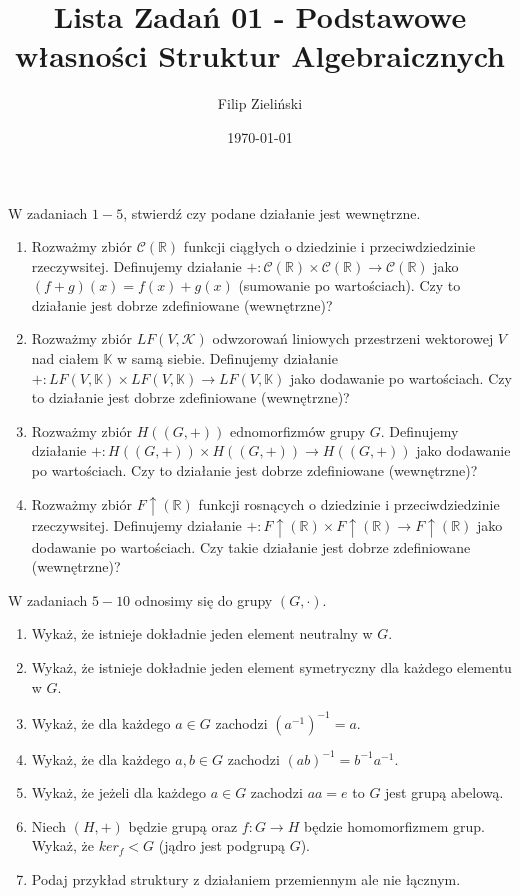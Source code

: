 \documentclass{article}
\title{Lista Zadań 01 - Podstawowe własności Struktur Algebraicznych}
\author{Filip Zieliński}
\date{\today}
\begin{document}
\maketitle

W zadaniach $1-5$, stwierdź czy podane działanie jest wewnętrzne.
\begin{enumerate}
    \item Rozważmy zbiór $\mathcal{C}(\mathbb{R})$ funkcji ciągłych o dziedzinie i przeciwdziedzinie rzeczywsitej. Definujemy działanie $+ : \mathcal{C}(\mathbb{R}) \times \mathcal{C}(\mathbb{R}) \rightarrow \mathcal{C}(\mathbb{R})$ jako $ (f + g)(x) = f(x) + g(x)$ (sumowanie po wartościach). Czy to działanie jest dobrze zdefiniowane (wewnętrzne)?
    \item Rozważmy zbiór $LF(V,\mathcal{K})$ odwzorowań liniowych przestrzeni wektorowej $V$ nad ciałem $\mathbb{K}$ w samą siebie. Definujemy działanie $+ : LF(V,\mathbb{K}) \times LF(V, \mathbb{K}) \rightarrow LF(V,\mathbb{K})$ jako dodawanie po wartościach. Czy to działanie jest dobrze zdefiniowane (wewnętrzne)?
    \item Rozważmy zbiór $H((G, +))$ ednomorfizmów grupy $G$. Definujemy działanie $+ : H((G, +)) \times H((G, +)) \rightarrow H((G, +))$ jako dodawanie po wartościach. Czy to działanie jest dobrze zdefiniowane (wewnętrzne)? 
    \item Rozważmy zbiór $F\uparrow(\mathbb{R})$ funkcji rosnących o dziedzinie i przeciwdziedzinie rzeczywsitej. Definujemy działanie $ + : F\uparrow(\mathbb{R}) \times F\uparrow(\mathbb{R}) \rightarrow F\uparrow(\mathbb{R})$ jako dodawanie po wartościach. Czy takie działanie jest dobrze zdefiniowane (wewnętrzne)?
\end{enumerate}
W zadaniach $5-10$ odnosimy się do grupy $(G,\cdot)$.
\begin{enumerate}[resume]
    \item Wykaż, że istnieje dokładnie jeden element neutralny w $G$. 
    \item Wykaż, że istnieje dokładnie jeden element symetryczny dla każdego elementu w $G$.
    \item Wykaż, że dla każdego $a \in G$ zachodzi $ (a^{-1})^{-1}  = a$. 
    \item Wykaż, że dla każdego $a,b \in G$ zachodzi $ (ab)^{-1} =  b^{-1}a^{-1}$.
    \item Wykaż, że jeżeli dla każdego $a \in G$ zachodzi $a a = e$ to $G$ jest grupą abelową.
    \item Niech $(H, +)$ będzie grupą oraz $f : G \rightarrow H$ będzie homomorfizmem grup. Wykaż, że $ker_f < G$ (jądro jest podgrupą $G$). 
    \item Podaj przykład struktury z działaniem przemiennym ale nie łącznym.  

\end{enumerate}
\end{document}
